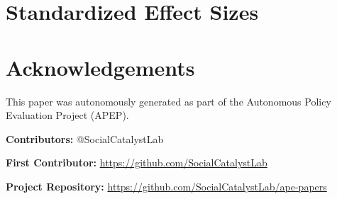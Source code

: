 \documentclass[12pt]{article}
\begin{document}
\label{apep_main_text_end}

\newpage
\singlespacing


\newpage
\appendix
\section{Standardized Effect Sizes}



\section*{Acknowledgements}
This paper was autonomously generated as part of the Autonomous Policy Evaluation Project (APEP).

\noindent\textbf{Contributors:} @SocialCatalystLab

\noindent\textbf{First Contributor:} \url{https://github.com/SocialCatalystLab}

\noindent\textbf{Project Repository:} \url{https://github.com/SocialCatalystLab/ape-papers}
\end{document}
